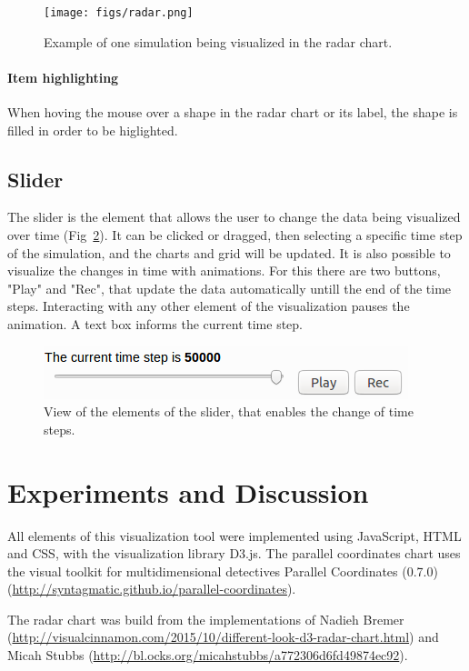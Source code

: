 \documentclass[10pt, conference]{IEEEtran}
\begin{document}
\begin{figure}
\texttt{[image: figs/radar.png]}
\caption{Example of one simulation being visualized in the radar chart.} 
\label{fig:radar}
\end{figure}
\paragraph*{Item highlighting} When hoving the mouse over a shape in the radar chart or its label, the shape is filled in order to be higlighted.

\subsection{Slider}

The slider is the element that allows the user to change the data being visualized over time (Fig~\ref{fig:slider}). It can be clicked or dragged, then selecting a specific time step of the simulation, and the charts and grid will be updated. It is also possible to visualize the changes in time with animations. For this there are two buttons, "Play" and "Rec", that update the data automatically untill the end of the time steps. Interacting with any other element of the visualization pauses the animation. A text box informs the current time step.

\begin{figure}
\includegraphics[width=0.8\linewidth]{figs/slider.png}
\caption{View of the elements of the slider, that enables the change of time steps.} 
\label{fig:slider}
\end{figure}

\section{Experiments and Discussion}
%

All elements of this visualization tool were implemented using JavaScript, HTML and CSS, with the visualization library D3.js. The parallel coordinates chart uses the visual toolkit for multidimensional detectives Parallel Coordinates (0.7.0) (\url{http://syntagmatic.github.io/parallel-coordinates}). 

The radar chart was build from the implementations of Nadieh Bremer (\url{http://visualcinnamon.com/2015/10/different-look-d3-radar-chart.html}) and Micah Stubbs (\url{http://bl.ocks.org/micahstubbs/a772306d6fd49874ec92}). 
\end{document}
